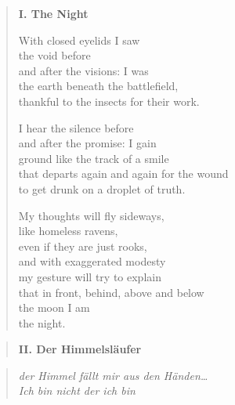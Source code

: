 \begin{verse}

{\bfseries I. The Night}

With closed eyelids I saw\\
the void before\\
and after the visions: I was\\
the earth beneath the battlefield,\\
thankful to the insects for their work.

I hear the silence before\\
and after the promise: I gain\\
ground like the track of a smile\\
that departs again and again for the wound\\
to get drunk on a droplet of truth.

My thoughts will fly sideways,\\
like homeless ravens,\\
even if they are just rooks,\\
and with exaggerated modesty\\
my gesture will try to explain\\
that in front, behind, above and below\\
the moon I am\\
the night.
\end{verse}

\clearpage

\begin{verse}
{\bfseries II. Der Himmelsläufer}
\end{verse}

\begin{quote}
\itshape
der Himmel fällt mir aus den Händen\ldots\\
Ich bin nicht der ich bin

\end{quote}

